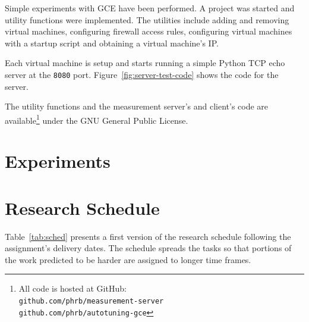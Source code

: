 \documentclass[a4paper, 12pt]{article}
\begin{document}
Simple experiments with GCE have been performed. A project
was started and utility functions were implemented.
The utilities include adding and removing virtual machines,
configuring firewall access rules, configuring virtual machines
with a startup script and obtaining a virtual machine's IP.

Each virtual machine is setup and starts running a simple
Python TCP echo server at the \texttt{\footnotesize 8080}
port. Figure~\ref{fig:server-test-code} shows the code for the
server.

The utility functions and the measurement server's and client's code
are available\footnote{All code is hosted at GitHub: \\
\texttt{\scriptsize github.com/phrb/measurement-server} \\
\texttt{\scriptsize github.com/phrb/autotuning-gce}}
under the GNU General Public License.



\section{Experiments} \label{sec:exp}

\section{Research Schedule} \label{sec:sched}

Table~\ref{tab:sched} presents a first version of the research schedule
following the assignment's delivery dates.
The schedule spreads the tasks so that portions of the work
predicted to be harder are assigned to longer time frames.

\newcommand{\specialcell}[2][c]{%
  \begin{tabular}[#1]{@{}K@{}}#2\end{tabular}}
\end{document}
